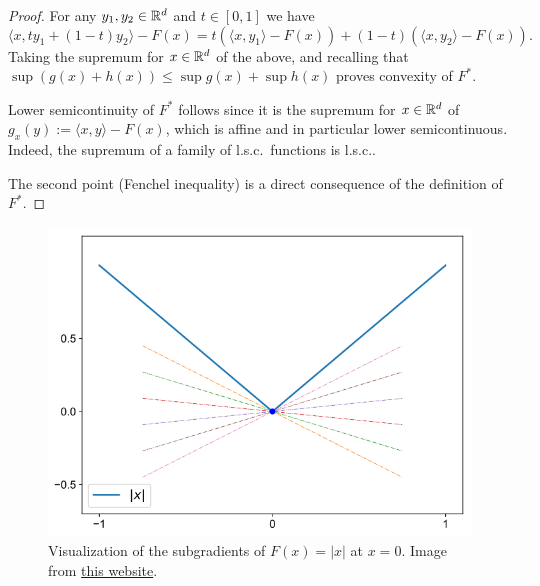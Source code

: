  \begin{proof}
     For any $y_1,y_2\in\mathbb{R}^d$ and $t\in[0,1]$ we have
     \begin{equation}
         \langle x, ty_1+(1-t)y_2 \rangle-F(x) =
         t \left(\langle x, y_1\rangle-F(x)\right) + (1-t) \left(\langle x, y_2\rangle-F(x)\right).
     \end{equation}
     Taking the supremum for $x\in\mathbb{R}^d$ of the above, and recalling that $\sup(g(x)+h(x))\le \sup g(x)+\sup h(x)$ proves convexity of $F^*$.
 
     Lower semicontinuity of $F^*$ follows since it is the supremum for $x\in\mathbb{R}^d$ of $g_x(y):=\langle x,y\rangle -F(x)$, which is affine and in particular lower semicontinuous. Indeed, the supremum of a family of l.s.c.~functions is l.s.c..
 
     The second point (Fenchel inequality) is a direct consequence of the definition of $F^*$.
 \end{proof}
 
 
 
 
 
 
 \begin{figure}
     \centering
     \includegraphics[width=.4\textwidth]{images/abs-subgrad.png}
     \caption{Visualization of the subgradients of $F(x)=|x|$ at $x=0$. Image from \href{https://tlienart.github.io/posts/2018/09/23-convex-optimisation-1/}{this website}.}
     \label{fig:subgrad-abs}
 \end{figure}
 
